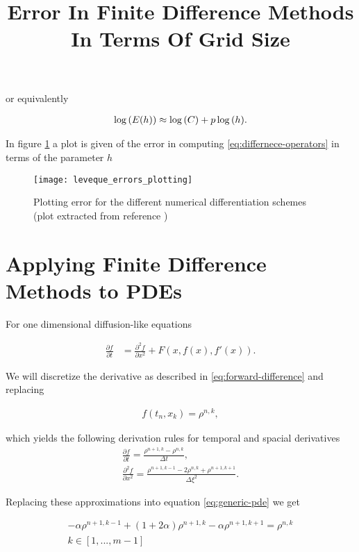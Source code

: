 or equivalently

\begin{align}
	\log\left({E(h)}\right)\approx \log\left({C}\right)+p\log{ \left({h}\right) }.
\end{align}

In figure \ref{fig:leveque_errors_plotting} a plot is given of the error in computing \ref{eq:differnece-operators} in terms of the parameter $h$


\begin{figure}[h!]
\title{Error In Finite Difference Methods In Terms Of Grid Size}
\centering

	\texttt{[image: leveque\_errors\_plotting]}
	\caption{Plotting error for the different numerical differentiation schemes (plot extracted from reference \cite{leveque_ch1})}
\label{fig:leveque_errors_plotting}
\end{figure}

\newpage
\section{Applying Finite Difference Methods to PDEs}

For one dimensional diffusion-like equations

\begin{align}
\label{eq:generic-pde}
\frac{\partial f}{\partial t} &= \frac{\partial^2 f}{\partial x^2} + F(x, f(x), f'(x)).
\end{align}

We will discretize the derivative as described in \ref{eq:forward-difference} and replacing 

\begin{align}
	f(t_n, x_k) = \rho^{n,k},
\end{align}

which yields the following derivation rules for temporal and spacial derivatives
\begin{align}
\frac{\partial f}{\partial t} = \frac{\rho^{n+1, k}-\rho^{n, k}}{\Delta t},\\
\frac{\partial^2 f}{\partial x^2} = \frac{\rho^{n+1, k-1}-2\rho^{n, k}+\rho^{n+1, k+1}}{\Delta \xi^2}.
\end{align}

Replacing these approximations into equation \ref{eq:generic-pde} we get

\begin{align}	
\label{eq:linear-eq-numeric}
    -\alpha \rho^{n+1,k-1} + ( 1 + 2\alpha ) \rho^{n+1,k} -\alpha \rho^{n+1,k+1} =  \rho^{n,k}\\
    k \in [1, ... , m-1]
\end{align}

